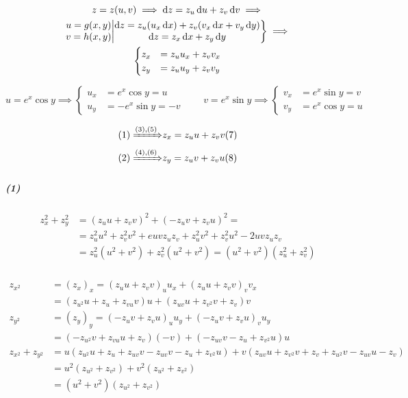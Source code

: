 \documentclass[11pt,a4paper,titlepage]{article}
\begin{document}
\begin{infobox}{}
\begin{gather*}
z=z(u,v) \implies \dif z =z_u \dif u + z_v \dif v \implies \\
\left.
\begin{matrix}
u = g(x,y)\\
v=h(x,y)
\end{matrix}
\middle|
\begin{matrix}
\dif z = z_u(u_x\dif x)+z_v(v_x\dif x + v_y\dif y)\\
\dif z = z_x\dif x + z_y \dif y
\end{matrix}
\right\rbrace \implies \\
\begin{cases}
z_x &= z_uu_x+z_vv_x \\
z_y &= z_uu_y+z_vv_y
\end{cases}
\end{gather*}
\end{infobox}

\[
u=e^x\cos y \implies \begin{cases}
u_x &= e^x\cos y = u\\
u_y &= -e^x\sin y = -v
\end{cases}
\qquad
v=e^x\sin y \implies \begin{cases}
v_x &=e^x\sin y =v\\
v_y &=e^x\cos y = u
\end{cases}
\]

\begin{align*}
(1) \xRightarrow{(3),(5)} & z_x=z_u u + z_v v (7) \\
(2) \xRightarrow{(4),(6)} & z_y=z_u v + z_v u (8) \\
\end{align*}

\subparagraph{(1)}
\begin{align*}
z_x^2 + z_y^2 &= (z_u u + z_v v)^2+(-z_u v + z_v u)^2 =
\\ &=
z_u^2u^2+z_v^2v^2+euvz_uz_v+z_u^2v^2+z_v^2u^2-2uvz_uz_v \\
&=
z_u^2(u^2+v^2)+z_v^2(u^2+v^2) = (u^2+v^2)(z_u^2+z_v^2)
\end{align*}

\subparagraph{}
\begin{align}
z_{x^2} & =(z_x)_x = (z_uu+z_vv)_u u_x+(z_uu+z_vv)_vv_x \nonumber \\
&=
(z_{u^2}u+z_u+z_{vu}v)u+(z_{uv}u+z_{v^2}v+z_v)v\\
z_{y^2} &= (z_y)_y = (-z_uv +z_vu)_uu_y+(-z_uv+z_vu)_vu_y \nonumber \\
&= (-z_{u^2}v+z_{vu}u+z_v)(-v)+(-z_{uv}v-z_u+z_{v^2}u)u \\
z_{x^2}+z_{y^2} &= u(z_{u^2}u+z_u+z_{uv}v-z_{uv}v-z_u+z_{v^2}u)
+ v(z_{uv}u+z_{v^2}v+z_v+z_{u^2}v-z_{uv}u-z_v) \nonumber \\
&= u^2(z_{u^2}+z_{v^2})+v^2(z_{u^2}+z_{v^2}) \nonumber \\
&= (u^2+v^2)(z_{u^2}+z_{v^2})
\end{align}
\end{document}
